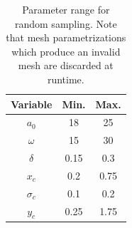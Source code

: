 \documentclass[../../thesis.tex]{subfiles}
\begin{document}
\begin{table}[h]
    \centering
    \caption{Parameter range for random sampling.
    Note that mesh parametrizations which produce an invalid mesh
    are discarded at runtime.}
    \begin{tabular}{ccc}
    \toprule
        Variable   & Min. & Max. \\ 
        \midrule
        $a_0$      & 18      & 25      \\
        $\omega$   & 15      & 30      \\
        $\delta$   & 0.15    & 0.3     \\
        \midrule
        $x_c$      & 0.2     & 0.75    \\
        $\sigma_c$ & 0.1     & 0.2     \\
        $y_c$      & 0.25    & 1.75    \\
        \bottomrule
    \end{tabular}
    \label{tab:parameter_range}
\end{table}
\end{document}
